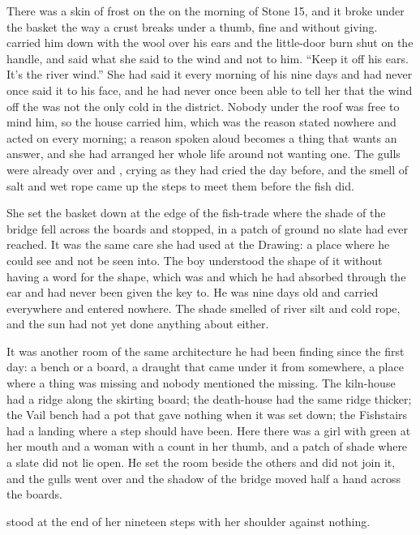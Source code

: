 
There was a skin of frost on the  on the morning of Stone 15, and it broke under the basket the way a crust breaks under a thumb, fine and without giving.  carried him down with the wool over his ears and the little-door burn shut on the handle, and said what she said to the wind and not to him. “Keep it off his ears. It's the river wind.” She had said it every morning of his nine days and had never once said it to his face, and he had never once been able to tell her that the wind off the  was not the only cold in the district. Nobody under the roof was free to mind him, so the house carried him, which was the reason stated nowhere and acted on every morning; a reason spoken aloud becomes a thing that wants an answer, and she had arranged her whole life around not wanting one. The gulls were already over  and , crying as they had cried the day before, and the smell of salt and wet rope came up the steps to meet them before the fish did.

She set the basket down at the edge of the fish-trade where the shade of the bridge fell across the boards and stopped, in a patch of ground no slate had ever reached. It was the same care she had used at the Drawing: a place where he could see and not be seen into. The boy understood the shape of it without having a word for the shape, which was  and which he had absorbed through the ear and had never been given the key to. He was nine days old and carried everywhere and entered nowhere. The shade smelled of river silt and cold rope, and the sun had not yet done anything about either.

It was another room of the same architecture he had been finding since the first day: a bench or a board, a draught that came under it from somewhere, a place where a thing was missing and nobody mentioned the missing. The kiln-house had a ridge along the skirting board; the death-house had the same ridge thicker; the Vail bench had a pot that gave nothing when it was set down; the Fishstairs had a landing where a step should have been. Here there was a girl with green at her mouth and a woman with a count in her thumb, and a patch of shade where a slate did not lie open. He set the room beside the others and did not join it, and the gulls went over and the shadow of the bridge moved half a hand across the boards.

 stood at the end of her nineteen steps with her shoulder against nothing.

